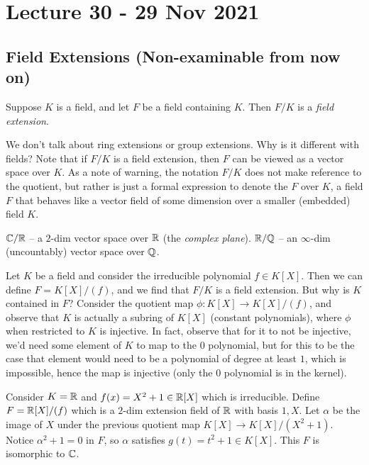 \section{Lecture 30 - 29 Nov 2021}
\subsection{Field Extensions (Non-examinable from now on)}
\begin{definition}
  Suppose $K$ is a field, and let $F$ be a field containing $K$. Then $F/K$ is a
  \emph{field extension}.
  \label{def:fieldExt}
\end{definition}
We don't talk about ring extensions or group extensions. Why is it
different with fields? Note that if $F/K$ is a field extension, then $F$ can be viewed as
a vector space over $K$. As a note of warning, the notation $F/K$ does not make reference
to the quotient, but rather is just a formal expression to denote the $F$ over $K$, a
field $F$ that behaves like a vector field of some dimension over a smaller (embedded)
field $K$.

\begin{example}
  $\mathbb C/\mathbb R$ -- a $2$-dim vector space over $\mathbb R$ (the \emph{complex plane}).
  $\mathbb R/\mathbb Q$ -- an $\infty$-dim (uncountably) vector space over $\mathbb Q$.
\end{example}
\begin{example}
  Let $K$ be a field and consider the irreducible polynomial $f\in K[X]$. Then we can
  define $F=K[X]/(f)$, and we find that $F/K$ is a field extension. But why is $K$
  contained in $F$? Consider the quotient map $\phi:K[X]\to K[X]/(f)$, and observe that
  $K$ is actually a subring of $K[X]$ (constant polynomials), where $\phi$ when restricted
  to $K$ is injective. In fact, observe that for it to not be injective, we'd need some
  element of $K$ to map to the $0$ polynomial, but for this to be the case that element
  would need to be a polynomial of degree at least $1$, which is impossible, hence the map
  is injective (only the $0$ polynomial is in the kernel).
\end{example}
\begin{example}
  Consider $K=\mathbb R$ and $f(x)=X^2+1\in \mathbb R[X]$ which is irreducible. Define $F=\mathbb R[X]/(f)$
  which is a $2$-dim extension field of $\mathbb R$ with basis $1, X$. Let $\alpha$ be the image
  of $X$ under the previous quotient map $K[X]\to K[X]/(X^2+1)$. Notice $\alpha^2+1=0$ in
  $F$, so $\alpha$ satisfies $g(t)=t^2+1\in K[X]$. This $F$ is isomorphic to $\mathbb C$.
\end{example}

